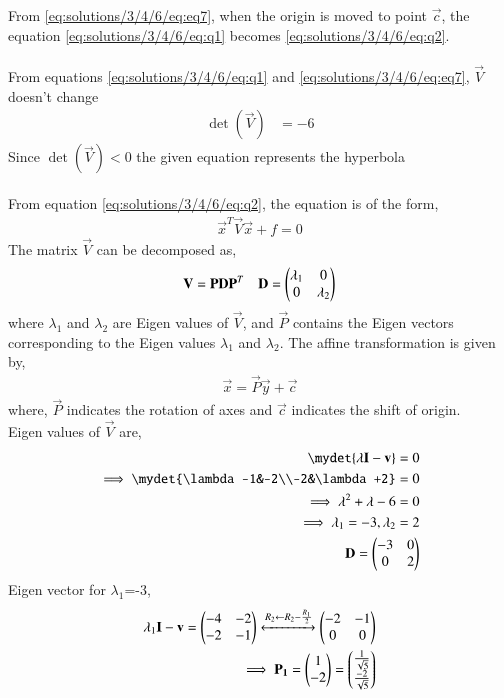 From \eqref{eq:solutions/3/4/6/eq:eq7}, when the origin is moved to point $\vec{c}$, the equation \eqref{eq:solutions/3/4/6/eq:q1} becomes \eqref{eq:solutions/3/4/6/eq:q2}.\\
\\
From equations \eqref{eq:solutions/3/4/6/eq:q1} and \eqref{eq:solutions/3/4/6/eq:eq7}, $\vec{V}$ doesn't change
\begin{align}
    \det(\vec{V})&=-6
\end{align}
Since $\det(\vec{V})<0$ the given equation represents the hyperbola\\
\\
From equation \eqref{eq:solutions/3/4/6/eq:q2}, the equation is of the form,
\begin{align}
    \vec{x}^T\vec{V}\vec{x}+f=0
\end{align}
The matrix $\vec{V}$ can be decomposed as,
\begin{align}
    \mathbf{V} = \mathbf{P}\mathbf{D}\mathbf{P}^T \quad \mathbf{D}=\begin{pmatrix}\lambda_1&0\\0&\lambda_2\end{pmatrix}
\end{align}
where $\lambda_1$ and $\lambda_2$ are Eigen values of $\vec{V}$, and $\vec{P}$ contains the Eigen vectors corresponding to the Eigen values $\lambda_1$ and $\lambda_2$. The affine transformation is given by,
\begin{align}
    \vec{x} = \vec{P}\vec{y}+\vec{c}
\end{align}
where, $\vec{P}$ indicates the rotation of axes and $\vec{c}$ indicates the shift of origin.\\
Eigen values of $\vec{V}$ are,
\begin{align}
   \mydet{\lambda\vec{I}-\vec{v}}=0\\
    \implies \mydet{\lambda-1&-2\\-2&\lambda+2}=0\\
    \implies \lambda^2+\lambda-6=0\\
    \implies \lambda_1=-3,\lambda_2=2\\
    \vec{D}=\myvec{-3&0\\0&2}
\end{align}
Eigen vector for $\lambda_1$=-3,
\begin{align}
    \lambda_1\mathbf{I}-\mathbf{v}=\begin{pmatrix}-4&-2\\-2&-1\end{pmatrix}\xleftrightarrow[]{R_2\leftarrow R_2-\frac{R_1}{2}}\begin{pmatrix}-2&-1\\0&0\end{pmatrix}\\
    \implies \mathbf{P_1}=\begin{pmatrix}1\\-2\end{pmatrix}=\begin{pmatrix}\frac{1}{\sqrt{5}}\\\frac{-2}{\sqrt{5}}\end{pmatrix}
\end{align}
